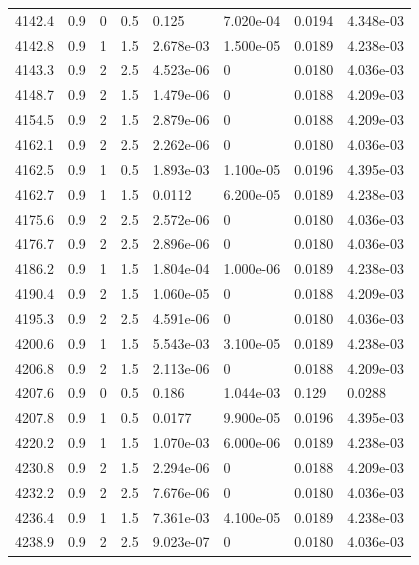 \documentclass[preview]{standalone}
\begin{document}
{{{{{{{{{{{{{{{{\begin{tabular}{L{1.2cm}C{1.2cm} C{0.3cm}C{0.5cm} C{1.4cm}C{1.4cm} C{1.4cm}C{1.4cm}}
  4142.4  &   0.9  & 0     & 0.5 &  0.125  & 7.020e-04  & 0.0194 &  4.348e-03   \\ 
  4142.8  &   0.9  & 1     & 1.5 &  2.678e-03  & 1.500e-05  & 0.0189 &  4.238e-03   \\ 
  4143.3  &   0.9  & 2     & 2.5 &  4.523e-06  & 0  & 0.0180 &  4.036e-03   \\ 
  4148.7  &   0.9  & 2     & 1.5 &  1.479e-06  & 0  & 0.0188 &  4.209e-03   \\ 
  4154.5  &   0.9  & 2     & 1.5 &  2.879e-06  & 0  & 0.0188 &  4.209e-03   \\ 
  4162.1  &   0.9  & 2     & 2.5 &  2.262e-06  & 0  & 0.0180 &  4.036e-03   \\ 
  4162.5  &   0.9  & 1     & 0.5 &  1.893e-03  & 1.100e-05  & 0.0196 &  4.395e-03   \\ 
  4162.7  &   0.9  & 1     & 1.5 &  0.0112  & 6.200e-05  & 0.0189 &  4.238e-03   \\ 
  4175.6  &   0.9  & 2     & 2.5 &  2.572e-06  & 0  & 0.0180 &  4.036e-03   \\ 
  4176.7  &   0.9  & 2     & 2.5 &  2.896e-06  & 0  & 0.0180 &  4.036e-03   \\ 
  4186.2  &   0.9  & 1     & 1.5 &  1.804e-04  & 1.000e-06  & 0.0189 &  4.238e-03   \\ 
  4190.4  &   0.9  & 2     & 1.5 &  1.060e-05  & 0  & 0.0188 &  4.209e-03   \\ 
  4195.3  &   0.9  & 2     & 2.5 &  4.591e-06  & 0  & 0.0180 &  4.036e-03   \\ 
  4200.6  &   0.9  & 1     & 1.5 &  5.543e-03  & 3.100e-05  & 0.0189 &  4.238e-03   \\ 
  4206.8  &   0.9  & 2     & 1.5 &  2.113e-06  & 0  & 0.0188 &  4.209e-03   \\ 
  4207.6  &   0.9  & 0     & 0.5 &  0.186  & 1.044e-03  & 0.129 &  0.0288   \\ 
  4207.8  &   0.9  & 1     & 0.5 &  0.0177  & 9.900e-05  & 0.0196 &  4.395e-03   \\ 
  4220.2  &   0.9  & 1     & 1.5 &  1.070e-03  & 6.000e-06  & 0.0189 &  4.238e-03   \\ 
  4230.8  &   0.9  & 2     & 1.5 &  2.294e-06  & 0  & 0.0188 &  4.209e-03   \\ 
  4232.2  &   0.9  & 2     & 2.5 &  7.676e-06  & 0  & 0.0180 &  4.036e-03   \\ 
  4236.4  &   0.9  & 1     & 1.5 &  7.361e-03  & 4.100e-05  & 0.0189 &  4.238e-03   \\ 
  4238.9  &   0.9  & 2     & 2.5 &  9.023e-07  & 0  & 0.0180 &  4.036e-03   \\ 

\end{tabular}}}}}}}}}}}}}}}}}
\end{document}
